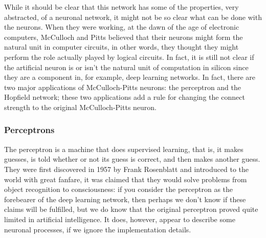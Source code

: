 \documentclass[12pt]{article}
\begin{document}
While it should be clear that this network has some of the properties,
very abstracted, of a neuronal network, it might not be so clear what
can be done with the neurons. When they were working, at the dawn of
the age of electronic computers, McCulloch and Pitts believed that
their neurons might form the natural unit in computer circuits, in
other words, they thought they might perform the role actually played
by logical circuits. In fact, it is still not clear if the artificial
neuron is or isn't the natural unit of computation in silicon since
they are a component in, for example, deep learning networks. In fact,
there are two major applications of McCulloch-Pitts neurons: the
perceptron and the Hopfield network; these two applications add a rule
for changing the connect strength to the original McCulloch-Pitts
neuron.

\subsubsection*{Perceptrons}

The perceptron is a machine that does supervised learning, that is, it
makes guesses, is told whether or not its guess is correct, and then
makes another guess. They were first discovered in 1957 by Frank
Rosenblatt \cite{Rosenblatt1958} and introduced to the world with great fanfare, it was
claimed that they would solve problems from object recognition to
consciousness: if you consider the perceptron as the forebearer of the
deep learning network, then perhaps we don't know if these claims will
be fulfilled, but we do know that the original perceptron proved quite
limited in artificial intelligence. It does, however, appear to
describe some neuronal processes, if we ignore the implementation
details.
\end{document}
